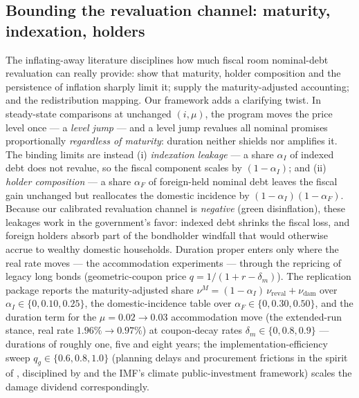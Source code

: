 \documentclass[12pt]{article}
\begin{document}
\subsection{Bounding the revaluation channel: maturity, indexation, holders}
\label{subsec:maturity}

The inflating-away literature disciplines how much fiscal room nominal-debt
revaluation can really provide: \citet{hilscher2022} show that maturity,
holder composition and the persistence of inflation sharply limit it;
\citet{hallsargent2011} supply the maturity-adjusted accounting;
\citet{doepkeschneider2006} and \citet{auclert2019} the redistribution
mapping. Our framework adds a clarifying twist. In steady-state comparisons
at unchanged $(i,\mu)$, the program moves the price level once --- a
\emph{level jump} --- and a level jump revalues all nominal promises
proportionally \emph{regardless of maturity}: duration neither shields nor
amplifies it. The binding limits are instead (i) \emph{indexation leakage}
--- a share $\alpha_I$ of indexed debt does not revalue, so the fiscal
component scales by $(1-\alpha_I)$; and (ii) \emph{holder composition} ---
a share $\alpha_F$ of foreign-held nominal debt leaves the fiscal gain
unchanged but reallocates the domestic incidence by
$(1-\alpha_I)(1-\alpha_F)$. Because our calibrated revaluation channel is
\emph{negative} (green disinflation), these leakages work in the
government's favor: indexed debt shrinks the fiscal loss, and foreign
holders absorb part of the bondholder windfall that would otherwise accrue
to wealthy domestic households. Duration proper enters only where the real
rate moves --- the accommodation experiments --- through the repricing of
legacy long bonds (geometric-coupon price $q = 1/(1+r-\delta_m)$). The
replication package reports the maturity-adjusted
share $\nu^{M} = (1-\alpha_I)\,\nu_{\mathrm{reval}} + \nu_{\mathrm{dam}}$
over $\alpha_I \in \{0, 0.10, 0.25\}$, the domestic-incidence table over
$\alpha_F \in \{0, 0.30, 0.50\}$, and the duration term for the
$\mu = 0.02 \to 0.03$ accommodation move (the extended-run stance, real
rate $1.96\% \to 0.97\%$) at coupon-decay rates $\delta_m \in \{0, 0.8,
0.9\}$ --- durations of roughly one, five and eight years; the
implementation-efficiency sweep $q_g \in \{0.6, 0.8, 1.0\}$
(planning delays and procurement frictions in the spirit of
\citealp{leeperwalkeryang2010}, disciplined by \citealp{bomligthart2014}
and the IMF's climate public-investment framework) scales the damage
dividend correspondingly.
\end{document}
